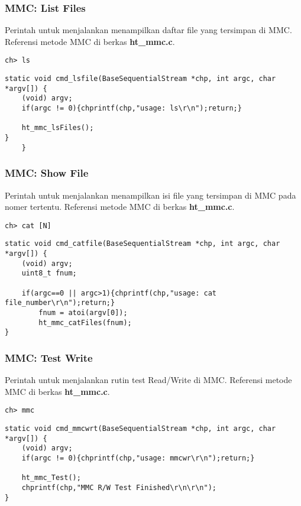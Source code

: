 \documentclass[12pt,]{article}
\begin{document}
	\subsubsection{MMC: List Files}
	Perintah untuk menjalankan menampilkan daftar file yang tersimpan di MMC.
	Referensi metode MMC di berkas \textbf{ht\_mmc.c}.
	\begin{verbatim}
ch> ls
	\end{verbatim}
	
	\begin{verbatim}
static void cmd_lsfile(BaseSequentialStream *chp, int argc, char *argv[]) {
	(void) argv;
	if(argc != 0){chprintf(chp,"usage: ls\r\n");return;}
	
	ht_mmc_lsFiles();
}
	}
	\end{verbatim}
	
	\subsubsection{MMC: Show File}
	Perintah untuk menjalankan menampilkan isi file yang tersimpan di MMC pada nomer tertentu.
	Referensi metode MMC di berkas \textbf{ht\_mmc.c}.
	\begin{verbatim}
ch> cat [N]
	\end{verbatim}
	
	\begin{verbatim}
static void cmd_catfile(BaseSequentialStream *chp, int argc, char *argv[]) {
	(void) argv;
	uint8_t fnum;
	
	if(argc==0 || argc>1){chprintf(chp,"usage: cat file_number\r\n");return;}
		fnum = atoi(argv[0]);
		ht_mmc_catFiles(fnum);
}
	\end{verbatim}
	
	\subsubsection{MMC: Test Write}
	Perintah untuk menjalankan rutin test Read/Write di MMC.
	Referensi metode MMC di berkas \textbf{ht\_mmc.c}.
	\begin{verbatim}
ch> mmc
	\end{verbatim}
	
	\begin{verbatim}
static void cmd_mmcwrt(BaseSequentialStream *chp, int argc, char *argv[]) {
	(void) argv;
	if(argc != 0){chprintf(chp,"usage: mmcwr\r\n");return;}
	
	ht_mmc_Test();
	chprintf(chp,"MMC R/W Test Finished\r\n\r\n");
}
	\end{verbatim}
	
\end{document}

